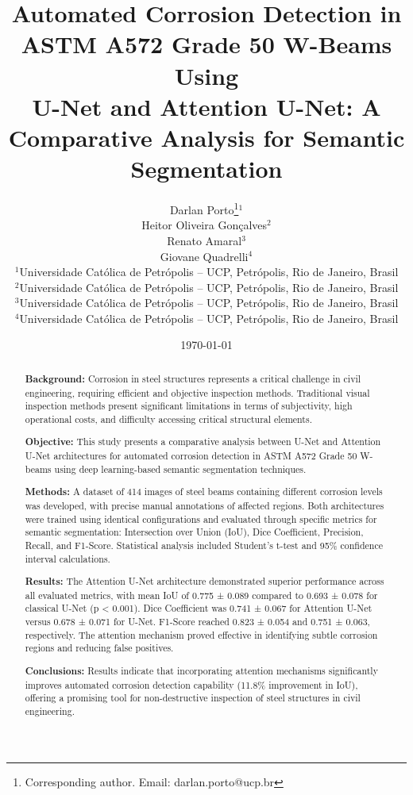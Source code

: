 \documentclass[12pt,a4paper,twoside]{article}
\title{%
    Automated Corrosion Detection in ASTM A572 Grade 50 W-Beams Using \\
    U-Net and Attention U-Net: A Comparative Analysis for Semantic Segmentation%
}
\author{%
    Darlan Porto\thanks{Corresponding author. Email: darlan.porto@ucp.br}$^1$ \\
    Heitor Oliveira Gonçalves$^2$ \\
    Renato Amaral$^3$ \\
    Giovane Quadrelli$^4$ \\[0.5em]
    \small $^1$Universidade Católica de Petrópolis – UCP, Petrópolis, Rio de Janeiro, Brasil \\
    \small $^2$Universidade Católica de Petrópolis – UCP, Petrópolis, Rio de Janeiro, Brasil \\
    \small $^3$Universidade Católica de Petrópolis – UCP, Petrópolis, Rio de Janeiro, Brasil \\
    \small $^4$Universidade Católica de Petrópolis – UCP, Petrópolis, Rio de Janeiro, Brasil
}
\date{\today}
\begin{document}

\maketitle

\thispagestyle{empty}


\begin{abstract}
\noindent \textbf{Background:} Corrosion in steel structures represents a critical challenge in civil engineering, requiring efficient and objective inspection methods. Traditional visual inspection methods present significant limitations in terms of subjectivity, high operational costs, and difficulty accessing critical structural elements.

\noindent \textbf{Objective:} This study presents a comparative analysis between U-Net and Attention U-Net architectures for automated corrosion detection in ASTM A572 Grade 50 W-beams using deep learning-based semantic segmentation techniques.

\noindent \textbf{Methods:} A dataset of 414 images of steel beams containing different corrosion levels was developed, with precise manual annotations of affected regions. Both architectures were trained using identical configurations and evaluated through specific metrics for semantic segmentation: Intersection over Union (IoU), Dice Coefficient, Precision, Recall, and F1-Score. Statistical analysis included Student's t-test and 95\% confidence interval calculations.

\noindent \textbf{Results:} The Attention U-Net architecture demonstrated superior performance across all evaluated metrics, with mean IoU of 0.775 ± 0.089 compared to 0.693 ± 0.078 for classical U-Net (p < 0.001). Dice Coefficient was 0.741 ± 0.067 for Attention U-Net versus 0.678 ± 0.071 for U-Net. F1-Score reached 0.823 ± 0.054 and 0.751 ± 0.063, respectively. The attention mechanism proved effective in identifying subtle corrosion regions and reducing false positives.

\noindent \textbf{Conclusions:} Results indicate that incorporating attention mechanisms significantly improves automated corrosion detection capability (11.8\% improvement in IoU), offering a promising tool for non-destructive inspection of steel structures in civil engineering.
\end{abstract}
\end{document}
